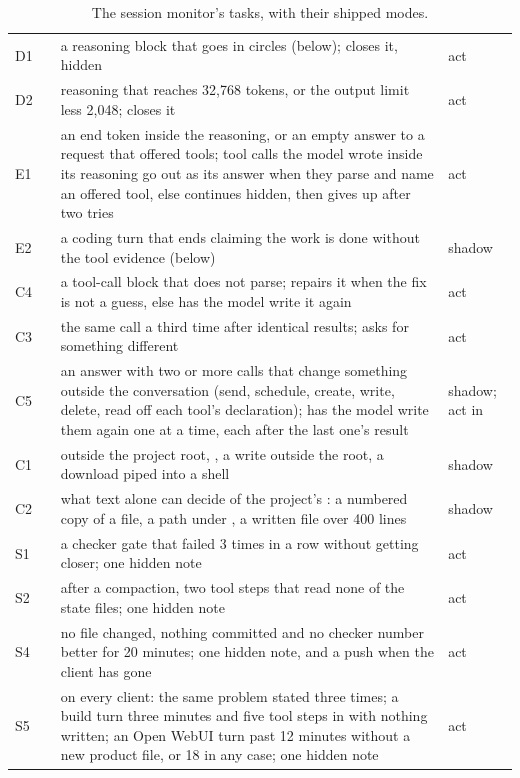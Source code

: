 \begin{table}[htbp]
\centering\small
\caption{The session monitor's tasks, with their shipped modes.}\label{tab:tasks}
\begin{tabularx}{\linewidth}{@{}L{.07\linewidth}L{.27\linewidth}YL{.08\linewidth}@{}}
\toprule
{} &  &  &  \\
\midrule
D1 &  & a reasoning block that goes in circles (below); closes it, hidden & act \\
D2 &  & reasoning that reaches 32,768 tokens, or the output limit less 2,048; closes it & act \\
E1 &  & an end token inside the reasoning, or an empty answer to a request that offered tools; tool calls the model wrote inside its reasoning go out as its answer when they parse and name an offered tool, else continues hidden, then gives up after two tries & act \\
E2 &  & a coding turn that ends claiming the work is done without the tool evidence (below) & shadow \\
C4 &  & a tool-call block that does not parse; repairs it when the fix is not a guess, else has the model write it again & act \\
C3 &  & the same call a third time after identical results; asks for something different & act \\
C5 &  & an answer with two or more calls that change something outside the conversation (send, schedule, create, write, delete, read off each tool's declaration); has the model write them again one at a time, each after the last one's result & shadow; act in  \\
C1 &  &  outside the project root, , a write outside the root, a download piped into a shell & shadow \\
C2 &  & what text alone can decide of the project's : a numbered copy of a file, a path under , a written file over 400 lines & shadow \\
S1 &  & a checker gate that failed 3 times in a row without getting closer; one hidden note & act \\
S2 &  & after a compaction, two tool steps that read none of the state files; one hidden note & act \\
S4 &  & no file changed, nothing committed and no checker number better for 20 minutes; one hidden note, and a push when the client has gone & act \\
S5 &  & on every client: the same problem stated three times; a build turn three minutes and five tool steps in with nothing written; an Open WebUI turn past 12 minutes without a new product file, or 18 in any case; one hidden note & act \\
\bottomrule
\end{tabularx}
\end{table}

